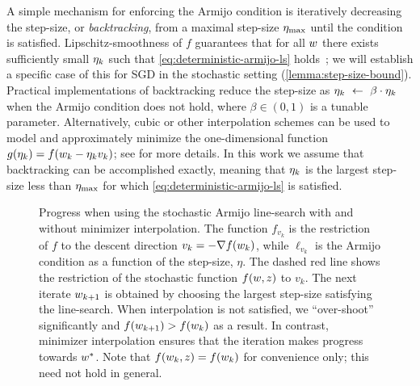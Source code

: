 A simple mechanism for enforcing the Armijo condition is iteratively decreasing the step-size, or \emph{backtracking}, from a maximal step-size \( \eta_{\text{max}} \) until the condition is satisfied.
Lipschitz-smoothness of \( f \) guarantees that for all \( w \) there exists sufficiently small \( \eta_k \) such that \autoref{eq:deterministic-armijo-ls} holds~\citep{nocedal1999numerical}; we will establish a specific case of this for \ac{SGD} in the stochastic setting (\autoref{lemma:step-size-bound}). 
Practical implementations of backtracking reduce the step-size as \( \eta_k~\gets~\beta \cdot \eta_k \) when the Armijo condition does not hold, where \( \beta \in (0,1) \) is a tunable parameter. 
Alternatively, cubic or other interpolation schemes can be used to model and approximately minimize the one-dimensional function \( g(\eta_k) = f(w_k - \eta_k v_k) \); see \citet{nocedal1999numerical} for more details.
In this work we assume that backtracking can be accomplished exactly, meaning that \( \eta_k \) is the largest step-size less than \( \eta_{\text{max}} \) for which \autoref{eq:deterministic-armijo-ls} is satisfied.

\begin{figure}[t]
    \centering
    
    \caption[Progress made by stochastic gradient descent when using the stochastic Armijo line-search with and without minimizer interpolation.]%
       {Progress when using the stochastic Armijo line-search with and without minimizer interpolation.
        The function \( f_{v_k} \) is the restriction of \( f \) to the descent direction \( v_k = -\nabla f(w_k) \), while \( \ell_{v_k} \) is the Armijo condition as a function of the step-size, \( \eta \).
        The dashed red line shows the restriction of the stochastic function \( f(w, z) \) to \( v_k \).
        The next iterate \( w_{k+1} \) is obtained by choosing the largest step-size satisfying the line-search. 
        When interpolation is not satisfied, we ``over-shoot'' significantly and \( f(w_{k+1}) > f(w_k) \) as a result.
        In contrast, minimizer interpolation ensures that the iteration makes progress towards \( w^* \). 
        Note that \( f(w_k,z) = f(w_k) \) for convenience only; this need not hold in general. 
    }%
    \label{fig:interpolation-ls}
\end{figure}

